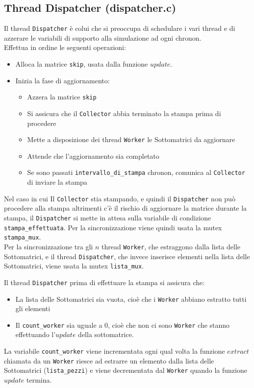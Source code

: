 \documentclass[]{article}
\begin{document}
\subsection{Thread Dispatcher (dispatcher.c)}
Il thread \texttt{Dispatcher} è colui che si preoccupa di schedulare i vari thread e di azzerare le variabili di supporto alla simulazione ad ogni chronon. \\
Effettua in ordine le seguenti operazioni:
\begin{itemize}
	\item Alloca la matrice \texttt{skip}, usata dalla funzione $update$.
	\item Inizia la fase di aggiornamento:
		\begin{itemize}
			\item Azzera la matrice \texttt{skip}
			\item Si assicura che il \texttt{Collector} abbia terminato la stampa prima di procedere
			\item Mette a disposizione dei thread \texttt{Worker} le Sottomatrici da aggiornare
			\item Attende che l'aggiornamento sia completato
			\item Se sono passati \texttt{intervallo\_di\_stampa} chronon, comunica al \texttt{Collector} di inviare la stampa
		\end{itemize}
	\end{itemize}
Nel caso in cui Il \texttt{Collector} stia stampando, e quindi il \texttt{Dispatcher} non può procedere alla stampa altrimenti c'è il rischio di aggiornare la matrice durante la stampa, il \texttt{Dispatcher} si mette in attesa sulla variabile di condizione \texttt{stampa\_effettuata}. Per la sincronizzazione viene quindi usata la mutex \texttt{stampa\_mux}. \\
Per la sincronizzazione tra gli $n$ thread \texttt{Worker}, che estraggono dalla lista delle Sottomatrici, e il thread \texttt{Dispatcher}, che invece inserisce elementi nella lista delle Sottomatrici, viene usata la mutex \texttt{lista\_mux}.

Il thread \texttt{Dispatcher} prima di effettuare la stampa si assicura che:
\begin{itemize}
	\item La lista delle Sottomatrici sia vuota, cioè che i \texttt{Worker} abbiano estratto tutti gli elementi
	\item Il \texttt{count\_worker} sia uguale a 0, cioè che non ci sono \texttt{Worker} che stanno effettuando l'$update$ della sottomatrice.
\end{itemize}
La variabile \texttt{count\_worker} viene incrementata ogni qual volta la funzione $extract$ chiamata da un \texttt{Worker} riesce ad estrarre un elemento dalla lista delle Sottomatrici (\texttt{lista\_pezzi}) e viene decrementata dal \texttt{Worker} quando la funzione $update$ termina.
\end{document}
